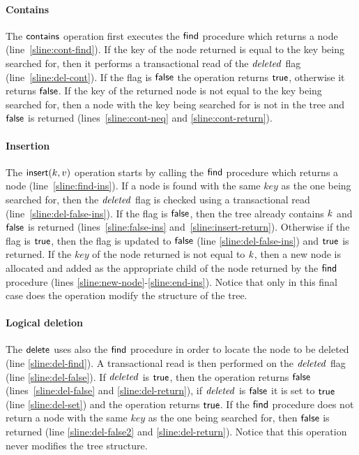 \paragraph{Contains} 
The $\act{contains}$ operation first executes the $\act{find}$ procedure which returns a node (line~\ref{sline:cont-find}).
If the key of the node returned is equal to the key being searched for, then it performs a transactional read of the $\ms{deleted}$ flag (line~\ref{sline:del-cont}).
If the flag is $\lit{false}$ the operation returns $\lit{true}$, otherwise it returns $\lit{false}$.
If the key of the returned node is not equal to the key being searched for, then a node with the key being searched for is not in the tree and $\lit{false}$ is returned (lines~\ref{sline:cont-neq} and \ref{sline:cont-return}).

\paragraph{Insertion} The $\act{insert}(k,v)$ operation starts by calling the $\act{find}$ procedure which returns a node (line~\ref{sline:find-ins}).
If a node is found with the same $key$ as the one being searched for, then the $\ms{deleted}$ flag is checked using a transactional read (line~\ref{sline:del-false-ins}).
If the flag is $\lit{false}$, then the tree already contains $\ms{k}$ and $\lit{false}$ is returned (lines~\ref{sline:false-ins} and~\ref{sline:insert-return}).
Otherwise if the flag is $\lit{true}$, then the flag is updated to $\lit{false}$ (line \ref{sline:del-false-ins}) and $\lit{true}$ is returned.
If the $key$ of the node returned is not equal to $\ms{k}$, then a new node is allocated and added as the
appropriate child of the node returned by the $\act{find}$ procedure (lines \ref{sline:new-node}-\ref{sline:end-ins}).
Notice that only in this final case does the operation modify the structure of the tree.

\paragraph{Logical deletion} The $\act{delete}$ uses also the $\act{find}$ procedure in order to locate the node to be deleted (line \ref{sline:del-find}).
A transactional read is then performed on the $\ms{deleted}$ flag (line \ref{sline:del-false}).
If $\ms{deleted}$ is $\lit{true}$, then the operation returns $\lit{false}$ (lines~\ref{sline:del-false} and \ref{sline:del-return}), if $\ms{deleted}$
is $\lit{false}$ it is set to $\lit{true}$ (line \ref{sline:del-set}) and the operation returns $\lit{true}$.
If the $\act{find}$ procedure does not return a node with the same $key$ as the one being searched for, then $\lit{false}$ is returned (line \ref{sline:del-false2} and \ref{sline:del-return}).
Notice that this operation never modifies the tree structure.

